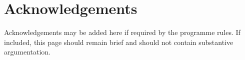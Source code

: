 \chapter*{Acknowledgements}

Acknowledgements may be added here if required by the programme rules. If included, this page should remain brief and should not contain substantive argumentation.

\cleardoublepage
